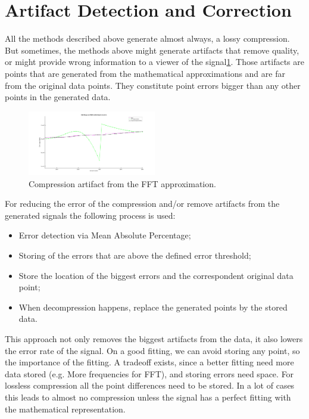 \documentclass[conference]{IEEEtran}
\begin{document}
\section{Artifact Detection and Correction}

All the methods described above generate almost always, a lossy compression. 
But sometimes, the methods above might generate artifacts that remove quality, or might provide wrong information to a viewer of the signal\ref{fig:artifact}.
Those artifacts are points that are generated from the mathematical approximations and are far from the original data points.
They constitute point errors bigger than any other points in the generated data.

\begin{figure}[ht]
  \centering
  \includegraphics[width=0.5\textwidth]{artifact-2.png}
  \caption{Compression artifact from the FFT approximation.}
  \label{fig:artifact}
\end{figure}
\vspace{5pt}

For reducing the error of the compression and/or remove artifacts from the generated signals the following process is used:

\begin{itemize}
    \item Error detection via Mean Absolute Percentage;
    \item Storing of the errors that are above the defined error threshold;
    \item Store the location of the biggest errors and the correspondent original data point;
    \item When decompression happens, replace the generated points by the stored data.
\end{itemize}

This approach not only removes the biggest artifacts from the data, it also lowers the error rate of the signal.
On a good fitting, we can avoid storing any point, so the importance of the fitting.
A tradeoff exists, since a better fitting need more data stored (e.g. More frequencies for FFT), and storing errors need space.
For lossless compression all the point differences need to be stored.
In a lot of cases this leads to almost no compression unless the signal has a perfect fitting with the mathematical representation.
\end{document}
